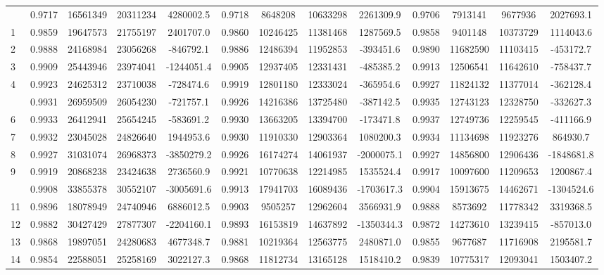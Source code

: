 \documentclass[
  12pt,
]{article}
\begin{document}
\begin{longtable}[t]{lcccccccccccc}
\endfoot
\bottomrule
\endlastfoot
0 & 0.9717 & 16561349 & 20311234 & 4280002.5 & 0.9718 & 8648208 & 10633298 & 2261309.9 & 0.9706 & 7913141 & 9677936 & 2027693.1\\
1 & 0.9859 & 19647573 & 21755197 & 2401707.0 & 0.9860 & 10246425 & 11381468 & 1287569.5 & 0.9858 & 9401148 & 10373729 & 1114043.6\\
2 & 0.9888 & 24168984 & 23056268 & -846792.1 & 0.9886 & 12486394 & 11952853 & -393451.6 & 0.9890 & 11682590 & 11103415 & -453172.7\\
3 & 0.9909 & 25443946 & 23974041 & -1244051.4 & 0.9905 & 12937405 & 12331431 & -485385.2 & 0.9913 & 12506541 & 11642610 & -758437.7\\
4 & 0.9923 & 24625312 & 23710038 & -728474.6 & 0.9919 & 12801180 & 12333024 & -365954.6 & 0.9927 & 11824132 & 11377014 & -362128.4\\
\addlinespace
5 & 0.9931 & 26959509 & 26054230 & -721757.1 & 0.9926 & 14216386 & 13725480 & -387142.5 & 0.9935 & 12743123 & 12328750 & -332627.3\\
6 & 0.9933 & 26412941 & 25654245 & -583691.2 & 0.9930 & 13663205 & 13394700 & -173471.8 & 0.9937 & 12749736 & 12259545 & -411166.9\\
7 & 0.9932 & 23045028 & 24826640 & 1944953.6 & 0.9930 & 11910330 & 12903364 & 1080200.3 & 0.9934 & 11134698 & 11923276 & 864930.7\\
8 & 0.9927 & 31031074 & 26968373 & -3850279.2 & 0.9926 & 16174274 & 14061937 & -2000075.1 & 0.9927 & 14856800 & 12906436 & -1848681.8\\
9 & 0.9919 & 20868238 & 23424638 & 2736560.9 & 0.9921 & 10770638 & 12214985 & 1535524.4 & 0.9917 & 10097600 & 11209653 & 1200867.4\\
\addlinespace
10 & 0.9908 & 33855378 & 30552107 & -3005691.6 & 0.9913 & 17941703 & 16089436 & -1703617.3 & 0.9904 & 15913675 & 14462671 & -1304524.6\\
11 & 0.9896 & 18078949 & 24740946 & 6886012.5 & 0.9903 & 9505257 & 12962604 & 3566931.9 & 0.9888 & 8573692 & 11778342 & 3319368.5\\
12 & 0.9882 & 30427429 & 27877307 & -2204160.1 & 0.9893 & 16153819 & 14637892 & -1350344.3 & 0.9872 & 14273610 & 13239415 & -857013.0\\
13 & 0.9868 & 19897051 & 24280683 & 4677348.7 & 0.9881 & 10219364 & 12563775 & 2480871.0 & 0.9855 & 9677687 & 11716908 & 2195581.7\\
14 & 0.9854 & 22588051 & 25258169 & 3022127.3 & 0.9868 & 11812734 & 13165128 & 1518410.2 & 0.9839 & 10775317 & 12093041 & 1503407.2\\

\end{longtable}
\end{document}
